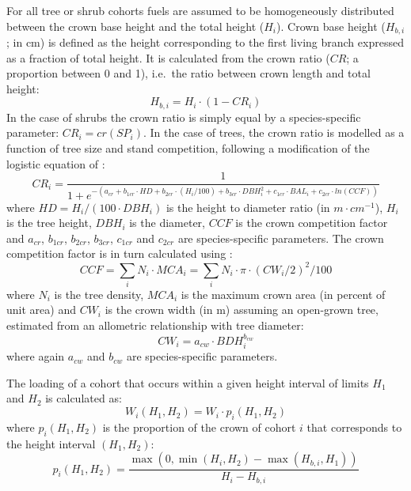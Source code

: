\documentclass[]{book}
\begin{document}
For all tree or shrub cohorts fuels are assumed to be homogeneously distributed between the crown base height and the total height (\(H_i\)). Crown base height (\(H_{b,i}\); in cm) is defined as the height corresponding to the first living branch expressed as a fraction of total height. It is calculated from the crown ratio (\(CR\); a proportion between 0 and 1), i.e.~the ratio between crown length and total height:
\begin{equation}
H_{b,i} = H_{i} \cdot (1 - CR_i)
\label{eq:CrownHeight}
\end{equation}
In the case of shrubs the crown ratio is simply equal by a species-specific parameter: \(CR_i = cr(SP_i)\). In the case of trees, the crown ratio is modelled as a function of tree size and stand competition, following a modification of the logistic equation of \citet{Hasenauer1996}:
\begin{equation}
CR_i = \frac{1}{1+e^{-(a_{cr}+b_{1cr}\cdot HD +b_{2cr} \cdot (H_i/100)+b_{3cr} \cdot DBH_i^2+c_{1cr} \cdot BAL_i + c_{2cr} \cdot ln(CCF))}}
\end{equation}
where \(HD = H_i/(100\cdot DBH_i)\) is the height to diameter ratio (in \(m\cdot cm^{-1}\)), \(H_i\) is the tree height, \(DBH_i\) is the diameter, \(CCF\) is the crown competition factor and \(a_{cr}\), \(b_{1cr}\), \(b_{2cr}\), \(b_{3cr}\), \(c_{1cr}\) and \(c_{2cr}\) are species-specific parameters. The crown competition factor is in turn calculated using \citep{Krajicek1961}:
\begin{equation}
CCF = \sum_{i}{N_i \cdot MCA_i}= \sum_{i}{N_i \cdot \pi \cdot (CW_i/2)^2/100}
\end{equation}
where \(N_i\) is the tree density, \(MCA_i\) is the maximum crown area (in percent of unit area) and \(CW_i\) is the crown width (in m) assuming an open-grown tree, estimated from an allometric relationship with tree diameter:
\begin{equation}
CW_i = a_{cw}\cdot BDH_i^{b_{cw}} 
\end{equation}
where again \(a_{cw}\) and \(b_{cw}\) are species-specific parameters.

The loading of a cohort that occurs within a given height interval of limits \(H_1\) and \(H_2\) is calculated as:
\begin{equation}
W_i(H_1, H_2) = W_i\cdot p_i(H_1, H_2)
\end{equation}
where \(p_i(H_1, H_2)\) is the proportion of the crown of cohort \(i\) that corresponds to the height interval \((H_1, H_2)\):
\begin{equation}
p_i(H_1, H_2) = \frac{\max(0, \min(H_i, H_2) - \max(H_{b,i}, H_1))}{H_{i}-H_{b,i}}
\end{equation}
\end{document}
